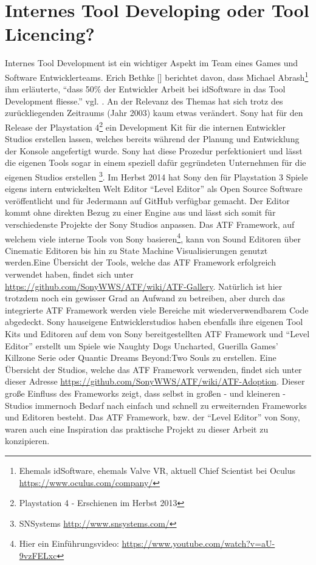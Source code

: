 \documentclass[pagesize, paper=a4, fontsize=12pt, titlepage=true, headings=small, headnosepline, abstractoff, liststotoc, nochapterprefix, plainheadsepline, twoside]{scrreprt}
\begin{document}
\section{Internes Tool Developing oder Tool Licencing?}
Internes Tool Development ist ein wichtiger Aspekt im Team eines Games und Software Entwicklerteams. Erich Bethke [] berichtet davon, dass Michael Abrash\footnote{Ehemals idSoftware, ehemals Valve VR, aktuell Chief Scientist bei Oculus \url{https://www.oculus.com/company/}} ihm erläuterte, “dass 50\% der Entwickler Arbeit bei idSoftware in das Tool Development fliesse.” vgl. \cite[S. 44]{Bethke2003}. An der Relevanz des Themas hat sich trotz des zurückliegenden Zeitraums (Jahr 2003) kaum etwas verändert. Sony hat für den Release der Playstation 4\footnote{Playstation 4 - Erschienen im Herbst 2013} ein Development Kit  für die internen Entwickler Studios  erstellen lassen, welches bereits während der Planung und Entwicklung der Konsole angefertigt wurde. Sony hat diese Prozedur perfektioniert und lässt die eigenen Tools sogar in einem speziell dafür gegründeten Unternehmen für die eigenen Studios erstellen \footnote{SNSystems \url{http://www.snsystems.com/}}. Im Herbst 2014 hat Sony den für Playstation 3 Spiele eigens intern entwickelten Welt Editor “Level Editor” als Open Source Software veröffentlicht und für Jedermann auf GitHub verfügbar gemacht. Der Editor kommt ohne direkten Bezug zu einer Engine aus und lässt sich somit für verschiedenste Projekte der Sony Studios anpassen. Das ATF Framework, auf welchem viele interne Tools von Sony basieren\footnote{Hier ein Einführungsvideo: \url{https://www.youtube.com/watch?v=aU-9vzFELxc}}, kann von Sound Editoren über Cinematic Editoren bis hin zu State Machine Visualisierungen genutzt werden.Eine Übersicht der Tools, welche das ATF Framework erfolgreich verwendet haben, findet sich unter \url{https://github.com/SonyWWS/ATF/wiki/ATF-Gallery}. Natürlich ist hier trotzdem noch ein gewisser Grad an Aufwand zu betreiben, aber durch das integrierte ATF Framework werden viele Bereiche mit wiederverwendbarem Code abgedeckt. Sony hauseigene Entwicklerstudios haben ebenfalls ihre eigenen Tool Kits und Editoren auf dem von Sony bereitgestellten ATF Framework und “Level Editor” erstellt um Spiele wie Naughty Dogs Uncharted, Guerilla Games’ Killzone Serie oder Quantic Dreams Beyond:Two Souls zu erstellen. Eine Übersicht der Studios, welche das ATF Framework verwenden, findet sich unter dieser Adresse \url{https://github.com/SonyWWS/ATF/wiki/ATF-Adoption}. Dieser große Einfluss des Frameworks zeigt, dass selbst in großen - und kleineren - Studios immernoch Bedarf nach einfach und schnell zu erweiternden Frameworks und Editoren besteht. Das ATF Framework, bzw. der “Level Editor” von Sony, waren auch eine Inspiration das praktische Projekt zu dieser Arbeit zu konzipieren.
\end{document}
